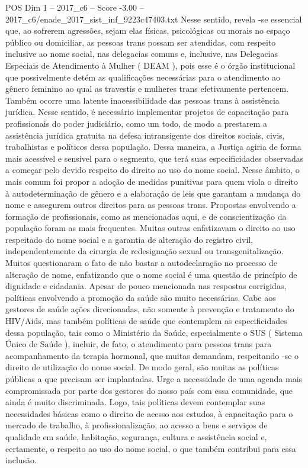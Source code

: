 \begin{textsample}{POS Dim 1 – 2017\_c6 – Score -3.00 – 2017\_c6/enade\_2017\_sist\_inf\_9223c47403.txt}
Nesse sentido, revela -se essencial que, ao sofrerem agressões, sejam elas físicas, psicológicas ou morais no espaço público ou domiciliar, as pessoas trans possam ser atendidas, com respeito inclusive ao nome social, nas delegacias comuns e, inclusive, nas Delegacias Especiais de Atendimento à Mulher ( DEAM ), pois esse é o órgão institucional que possivelmente detém as qualificações necessárias para o atendimento ao gênero feminino ao qual as travestis e mulheres trans efetivamente pertencem.
Também ocorre uma latente inacessibilidade das pessoas trans à assistência jurídica.
Nesse sentido, é necessário implementar projetos de capacitação para profissionais do poder judiciário, como um todo, de modo a prestarem a assistência jurídica gratuita na defesa intransigente dos direitos sociais, civis, trabalhistas e políticos dessa população.
Dessa maneira, a Justiça agiria de forma mais acessível e sensível para o segmento, que terá suas especificidades observadas a começar pelo devido respeito do direito ao uso do nome social.
Nesse âmbito, o mais comum foi propor a adoção de medidas punitivas para quem viola o direito à autodeterminação de gênero e a elaboração de leis que garantam a mudança do nome e assegurem outros direitos para as pessoas trans.
Propostas envolvendo a formação de profissionais, como as mencionadas aqui, e de conscientização da população foram as mais frequentes.
Muitas outras enfatizavam o direito ao uso respeitado do nome social e a garantia de alteração do registro civil, independentemente da cirurgia de redesignação sexual ou transgenitalização.
Muitos questionaram o fato de não bastar a autodeclaração no processo de alteração de nome, enfatizando que o nome social é uma questão de princípio de dignidade e cidadania.
Apesar de pouco mencionada nas respostas corrigidas, políticas envolvendo a promoção da saúde são muito necessárias.
Cabe aos gestores de saúde ações direcionadas, não somente à prevenção e tratamento do HIV/Aids, mas também políticas de saúde que contemplem as especificidades dessa população, tais como o Ministério da Saúde, especialmente o SUS ( Sistema Único de Saúde ), incluir, de fato, o atendimento para pessoas trans para acompanhamento da terapia hormonal, que muitas demandam, respeitando -se o direito de utilização do nome social.
De modo geral, são muitas as políticas públicas a que precisam ser implantadas.
Urge a necessidade de uma agenda mais compromissada por parte dos gestores do nosso país com essa comunidade, que ainda é muito discriminada.
Logo, tais políticas devem contemplar suas necessidades básicas como o direito de acesso aos estudos, à capacitação para o mercado de trabalho, à profissionalização, ao acesso a bens e serviços de qualidade em saúde, habitação, segurança, cultura e assistência social e, certamente, o respeito ao uso do nome social, o que também contribui para essa inclusão.

\end{textsample}
